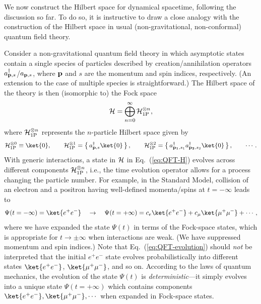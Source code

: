\documentclass[12pt]{article}
\begin{document}
We now construct the Hilbert space for dynamical spacetime, following the 
discussion so far.  To do so, it is instructive to draw a close analogy 
with the construction of the Hilbert space in usual (non-gravitational, 
non-conformal) quantum field theory.

Consider a non-gravitational quantum field theory in which asymptotic states 
contain a single species of particles described by creation/annihilation 
operators $a^\dagger_{{\bf p},s}$/$a_{{\bf p},s}$, where ${\bf p}$ and 
$s$ are the momentum and spin indices, respectively.  (An extension to 
the case of multiple species is straightforward.)  The Hilbert space of 
the theory is then (isomorphic to) the Fock space
%
\begin{equation}
  {\cal H} = \bigoplus_{n = 0}^{\infty} {\cal H}_{\rm 1P}^{\otimes n},
\label{eq:QFT-H}
\end{equation}
%
where ${\cal H}_{\rm 1P}^{\otimes n}$ represents the $n$-particle Hilbert 
space given by
%
\begin{equation}
  {\cal H}_{\rm 1P}^{\otimes 0} \equiv \ket{0},
\qquad
  {\cal H}_{\rm 1P}^{\otimes 1} 
    = \left\{\, a^\dagger_{{\bf p},s} \ket{0} \,\right\},
\qquad
  {\cal H}_{\rm 1P}^{\otimes 2} 
    = \left\{\, a^\dagger_{{\bf p_1},s_1} a^\dagger_{{\bf p_2},s_2} 
      \ket{0} \,\right\},
\qquad
  \cdots.
\label{eq:QFT-H_1P}
\end{equation}
%
With generic interactions, a state in ${\cal H}$ in Eq.~(\ref{eq:QFT-H}) 
evolves across different components ${\cal H}_{\rm 1P}^{\otimes n}$, i.e., 
the time evolution operator allows for a process changing the particle 
number.  For example, in the Standard Model, collision of an electron and 
a positron having well-defined momenta/spins at $t = -\infty$ leads to
%
\begin{equation}
  \Psi(t = -\infty) = \ket{e^+ e^-}
\quad\rightarrow\quad
  \Psi(t = +\infty) = c_e \ket{e^+ e^-} + c_\mu \ket{\mu^+ \mu^-} + \cdots,
\label{eq:QFT-evolution}
\end{equation}
%
where we have expanded the state $\Psi(t)$ in terms of the Fock-space 
states, which is appropriate for $t \rightarrow \pm \infty$ when 
interactions are weak.  (We have suppressed momentum and spin indices.) 
Note that Eq.~(\ref{eq:QFT-evolution}) should {\it not} be interpreted 
that the initial $e^+e^-$ state evolves probabilistically into different 
states $\ket{e^+ e^-}$, $\ket{\mu^+ \mu^-}$, and so on.  According 
to the laws of quantum mechanics, the evolution of the state $\Psi(t)$ 
is {\it deterministic}---it simply evolves into a unique state 
$\Psi(t = +\infty)$ which contains components $\ket{e^+ e^-}, 
\ket{\mu^+ \mu^-}, \cdots$ when expanded in Fock-space states.
\end{document}
